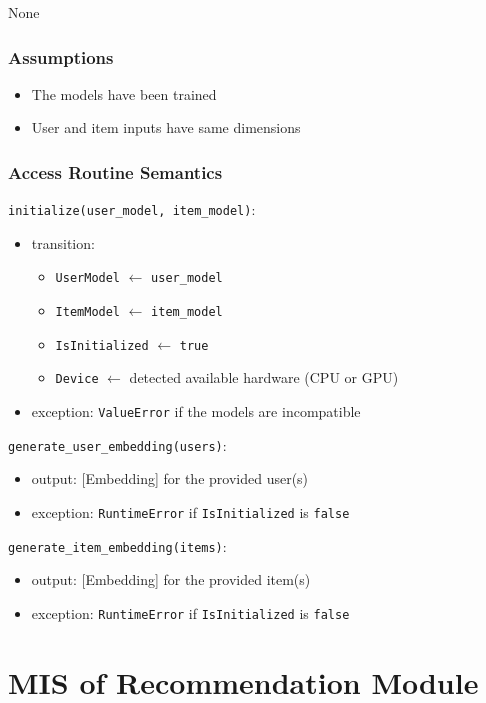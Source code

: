 \documentclass[12pt, titlepage]{article}
\begin{document}
None

\subsubsection{Assumptions}

\begin{itemize}
  \item The models have been trained
  \item User and item inputs have same dimensions
\end{itemize}
\subsubsection{Access Routine Semantics}

\noindent \texttt{initialize(user\_model, item\_model)}:
\begin{itemize}
\item transition:
  \begin{itemize}
    \item \texttt{UserModel} $\leftarrow$ \texttt{user\_model}
    \item \texttt{ItemModel} $\leftarrow$ \texttt{item\_model}
    \item \texttt{IsInitialized} $\leftarrow$ \texttt{true}
    \item \texttt{Device} $\leftarrow$ detected available hardware (CPU or GPU)
  \end{itemize}
\item exception: \texttt{ValueError} if the models are incompatible
\end{itemize}

\noindent \texttt{generate\_user\_embedding(users)}:
\begin{itemize}
\item output: [Embedding] for the provided user(s)
\item exception: \texttt{RuntimeError} if \texttt{IsInitialized} is \texttt{false}
\end{itemize}

\noindent \texttt{generate\_item\_embedding(items)}:
\begin{itemize}
\item output: [Embedding] for the provided item(s)
\item exception: \texttt{RuntimeError} if \texttt{IsInitialized} is \texttt{false}
\end{itemize}


\newpage

\section{MIS of Recommendation Module } \label{ModuleR}
\end{document}
